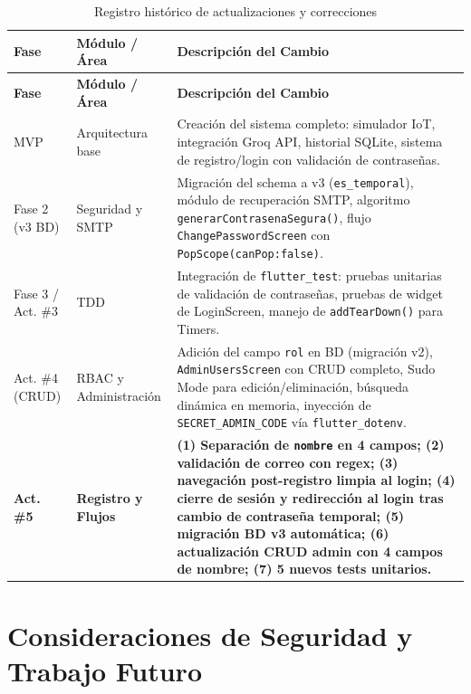 \documentclass[12pt,a4paper]{article}
\begin{document}
\begin{longtable}{p{2cm} p{3.5cm} p{8cm}}
\caption{Registro histórico de actualizaciones y correcciones} \label{tab:historial-updates} \\
\toprule
\textbf{Fase} & \textbf{Módulo / Área} & \textbf{Descripción del Cambio} \\
\midrule
\endfirsthead
\toprule
\textbf{Fase} & \textbf{Módulo / Área} & \textbf{Descripción del Cambio} \\
\midrule
\endhead
\bottomrule
\endlastfoot

MVP &
  Arquitectura base &
  Creación del sistema completo: simulador IoT, integración Groq API, historial SQLite,
  sistema de registro/login con validación de contraseñas. \\[0.3em]

Fase 2 (v3 BD) &
  Seguridad y SMTP &
  Migración del schema a v3 (\texttt{es\_temporal}), módulo de recuperación SMTP, algoritmo
  \texttt{generarContrasenaSegura()}, flujo \texttt{ChangePasswordScreen} con
  \texttt{PopScope(canPop:false)}. \\[0.3em]

Fase 3 / Act. \#3 &
  TDD &
  Integración de \texttt{flutter\_test}: pruebas unitarias de validación de contraseñas,
  pruebas de widget de LoginScreen, manejo de \texttt{addTearDown()} para Timers. \\[0.3em]

Act. \#4 (CRUD) &
  RBAC y Administración &
  Adición del campo \texttt{rol} en BD (migración v2), \texttt{AdminUsersScreen} con CRUD
  completo, Sudo Mode para edición/eliminación, búsqueda dinámica en memoria,
  inyección de \texttt{SECRET\_ADMIN\_CODE} vía \texttt{flutter\_dotenv}. \\[0.3em]

\textbf{Act. \#5} &
  \textbf{Registro y Flujos} &
  \textbf{(1) Separación de \texttt{nombre} en 4 campos; (2) validación de correo
  con regex; (3) navegación post-registro limpia al login; (4) cierre de sesión
  y redirección al login tras cambio de contraseña temporal; (5) migración BD v3
  automática; (6) actualización CRUD admin con 4 campos de nombre; (7) 5 nuevos
  tests unitarios.} \\

\end{longtable}

\section{Consideraciones de Seguridad y Trabajo Futuro}
\end{document}
